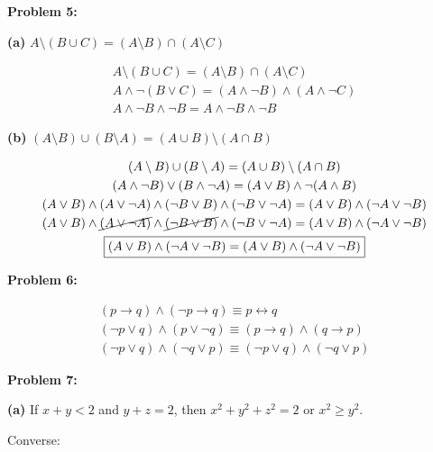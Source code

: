\documentclass{article}
\begin{document}
    \textbf{Problem 5:}

    \quad \textbf{(a)} $A\setminus (B\cup C) = (A\setminus B) \cap (A \setminus C)$

    \begin{gather*}
        A\setminus (B\cup C) = (A\setminus B) \cap (A \setminus C) \\
        A \land \neg (B \lor C) = (A \land \neg B) \land (A \land \neg C) \\
        \boxed{A \land \neg B \land \neg B = A \land \neg B \land \neg B}
    \end{gather*}

    \quad \textbf{(b)} $(A\setminus B) \cup (B\setminus A) = (A \cup B) \setminus (A \cap B)$

    \begin{gather*}
        (A\setminus B) \cup (B\setminus A) = (A \cup B) \setminus (A \cap B) \\
        (A \land \neg B) \lor (B \land \neg A) = (A \lor B) \land \neg(A \land B) \\
        (A\lor B) \land (A \lor \neg A) \land (\neg B \lor B) \land (\neg B \lor \neg A) = (A \lor B) \land (\neg A \lor \neg B) \\
        (A\lor B) \land \cancel{(A \lor \neg A)} \land \cancel{(\neg B \lor B)} \land (\neg B \lor \neg A) = (A \lor B) \land (\neg A \lor \neg B) \\
        \boxed{(A \lor B) \land (\neg A \lor \neg B) = (A \lor B) \land (\neg A \lor \neg B)}
    \end{gather*}

    \textbf{Problem 6:}

    \begin{gather*}
        (p\rightarrow q) \land (\neg p \rightarrow q) \equiv p \leftrightarrow q \\
        (\neg p \lor q) \land (p \lor \neg q) \equiv (p \rightarrow q) \land (q \rightarrow p) \\
        \boxed{(\neg p \lor q) \land (\neg q \lor p) \equiv (\neg p \lor q) \land (\neg q \lor p)}
    \end{gather*}

    \textbf{Problem 7:}

    \quad \textbf{(a)} If $x+y < 2$ and $y+z = 2$, then $x^2 + y^2 + z^2 = 2$ or $x^2 \geq y^2$.

    \quad\quad Converse:

\end{document}
